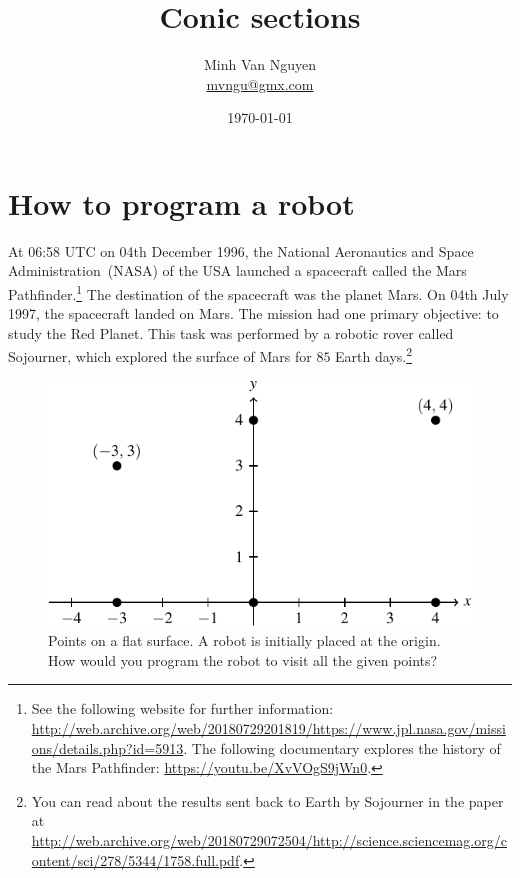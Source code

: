 \documentclass[a4paper,oneside,12pt]{article}
\begin{document}
\title{\Large\bf Conic sections}
\author{%
  Minh Van Nguyen \\
  \url{mvngu@gmx.com}
}
\date{\today}
\maketitle



\section{How to program a robot}

At 06:58 UTC on 04th December 1996, the National Aeronautics and Space
Administration~(NASA) of the USA launched a spacecraft called the Mars
Pathfinder.\footnote{
  See the following website for further information:
  \url{http://web.archive.org/web/20180729201819/https://www.jpl.nasa.gov/missions/details.php?id=5913}.
  The following documentary explores the history of the Mars
  Pathfinder:
  \url{https://youtu.be/XvVOgS9jWn0}.
}
The destination of the spacecraft was the planet Mars.  On 04th July
1997, the spacecraft landed on Mars.  The mission had one primary
objective: to study the Red Planet.  This task was performed by a
robotic rover called Sojourner, which explored the surface of Mars for
$85$ Earth days.\footnote{
  You can read about the results sent back to Earth by Sojourner in
  the paper at
  \url{http://web.archive.org/web/20180729072504/http://science.sciencemag.org/content/sci/278/5344/1758.full.pdf}.
}

\begin{figure}[!htbp]
\centering
\includegraphics[scale=1.1]{image/14/robot-path-points.pdf}
\caption{%
  Points on a flat surface.  A robot is initially placed at the
  origin.  How would you program the robot to visit all the given
  points?
}
\label{fig:conic:robot_points}
\end{figure}
\end{document}
